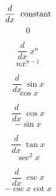 \documentclass[avery5371,grid]{flashcards}
\begin{document}
\begin{flashcard}{\large \vspace*{\fill} \[ \dfrac{d}{dx}\; \text{ \normalfont constant}  \] \vspace*{\fill}   }{\large \vspace*{\fill} \[ 0   \] \vspace*{\fill}   }\end{flashcard}

\begin{flashcard}{\large \vspace*{\fill} \[ \dfrac{d}{dx}\; x^n  \] \vspace*{\fill}   }{\large \vspace*{\fill} \[ nx^{n-1}   \] \vspace*{\fill}   }\end{flashcard}

\begin{flashcard}{\large \vspace*{\fill} \[ \dfrac{d}{dx}\; \sin x  \] \vspace*{\fill}   }{\large \vspace*{\fill} \[ \cos x   \] \vspace*{\fill}   }\end{flashcard}

\begin{flashcard}{\large \vspace*{\fill} \[ \dfrac{d}{dx}\; \cos x  \] \vspace*{\fill}   }{\large \vspace*{\fill} \[ -\sin x   \] \vspace*{\fill}   }\end{flashcard}

\begin{flashcard}{\large \vspace*{\fill} \[ \dfrac{d}{dx}\; \tan x  \] \vspace*{\fill}   }{\large \vspace*{\fill} \[ \sec^2 x   \] \vspace*{\fill}   }\end{flashcard}

\begin{flashcard}{\large \vspace*{\fill} \[ \dfrac{d}{dx}\; \csc x  \] \vspace*{\fill}   }{\large \vspace*{\fill} \[ -\csc x \cot x   \] \vspace*{\fill}   }\end{flashcard}
\end{document}
